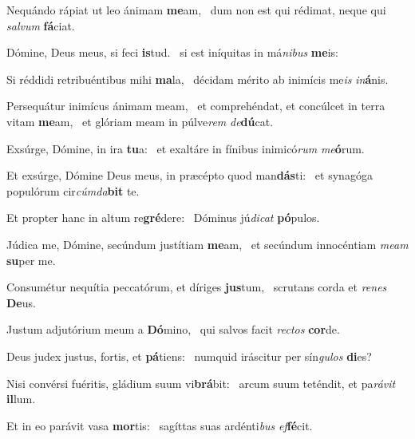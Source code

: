 \item Nequándo rápiat ut leo ánimam \textbf{me}am,~\psstar{} dum non est qui rédimat, neque qui \textit{salvum} \textbf{fá}ciat.

\item Dómine, Deus meus, si feci \textbf{is}tud.~\psstar{} si est iníquitas in má\textit{nibus} \textbf{me}is:

\item Si réddidi retribuéntibus mihi \textbf{ma}la,~\psstar{} décidam mérito ab inimícis me\textit{is} \textit{in}\textbf{á}nis.

\item Persequátur inimícus ánimam meam,~\pscross{} et comprehéndat, et concúlcet in terra vitam \textbf{me}am,~\psstar{} et glóriam meam in púlve\textit{rem} \textit{de}\textbf{dú}cat.

\item Exsúrge, Dómine, in ira \textbf{tu}a:~\psstar{} et exaltáre in fínibus inimicó\textit{rum} \textit{me}\textbf{ó}rum.

\item Et exsúrge, Dómine Deus meus, in præcépto quod man\textbf{dás}ti:~\psstar{} et synagóga populórum cir\textit{cúmda}\textbf{bit} te.

\item Et propter hanc in altum re\textbf{gré}dere:~\psstar{} Dóminus jú\textit{dicat} \textbf{pó}pulos.

\item Júdica me, Dómine, secúndum justítiam \textbf{me}am,~\psstar{} et secúndum innocéntiam \textit{meam} \textbf{su}per me.

\item Consumétur nequítia peccatórum, et díriges \textbf{jus}tum,~\psstar{} scrutans corda et \textit{renes} \textbf{De}us.

\item Justum adjutórium meum a \textbf{Dó}mino,~\psstar{} qui salvos facit \textit{rectos} \textbf{cor}de.

\item Deus judex justus, fortis, et \textbf{pá}tiens:~\psstar{} numquid iráscitur per sín\textit{gulos} \textbf{di}es?

\item Nisi convérsi fuéritis, gládium suum vi\textbf{brá}bit:~\psstar{} arcum suum teténdit, et pa\textit{rávit} \textbf{il}lum.

\item Et in eo parávit vasa \textbf{mor}tis:~\psstar{} sagíttas suas ardénti\textit{bus} \textit{ef}\hspace{-0.5mm}\textbf{fé}cit.

